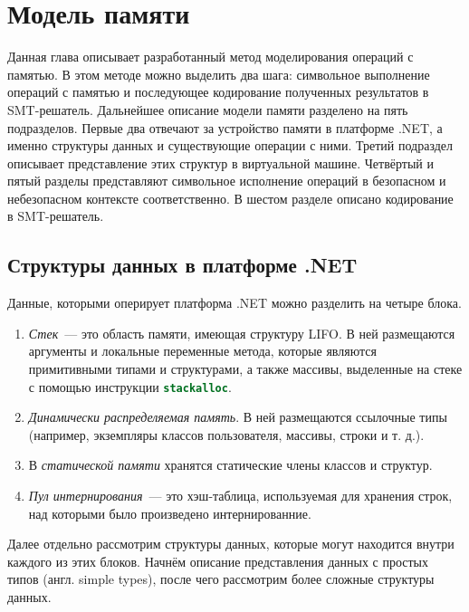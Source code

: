 \section{Модель памяти}


Данная глава описывает разработанный метод моделирования операций с памятью. В этом методе можно выделить два шага: символьное выполнение операций с памятью и последующее кодирование полученных результатов в SMT-решатель. Дальнейшее описание модели памяти разделено на пять подразделов. Первые два отвечают за устройство памяти в платформе .NET, а именно структуры данных и существующие операции с ними. Третий подраздел описывает представление этих структур в виртуальной машине. Четвёртый и пятый разделы представляют символьное исполнение операций в безопасном и небезопасном контексте соответственно. В шестом разделе описано кодирование в SMT-решатель.


\subsection{Структуры данных в платформе .NET}

Данные, которыми оперирует платформа .NET можно разделить на четыре блока.
\begin{enumerate}
    \item \emph{Стек}~--- это область памяти, имеющая структуру LIFO. В ней размещаются аргументы и локальные переменные метода, которые являются примитивными типами и структурами, а также массивы, выделенные на стеке с помощью инструкции \lstinline[language=csharp]{stackalloc}.
    \item \emph{Динамически распределяемая память}. В ней размещаются ссылочные типы (например, экземпляры классов пользователя, массивы, строки и т. д.).
    \item В \emph{статической памяти} хранятся статические члены классов и структур.
    \item \emph{Пул интернирования}~--- это хэш-таблица, используемая для хранения строк, над которыми было произведено интернированние.
\end{enumerate}

Далее отдельно рассмотрим структуры данных, которые могут находится внутри каждого из этих блоков. Начнём описание представления данных с простых типов (англ. simple types), после чего рассмотрим более сложные структуры данных.

